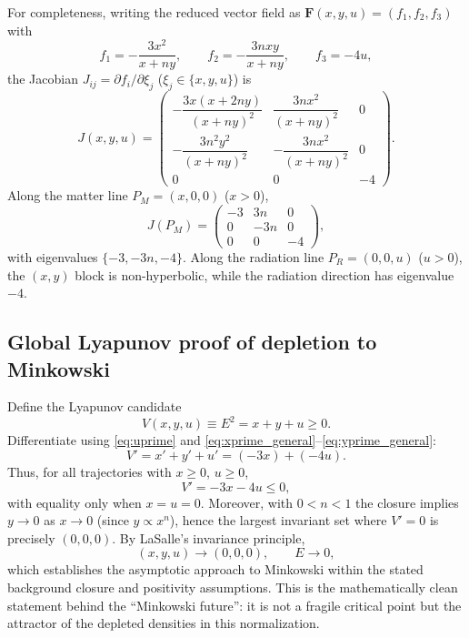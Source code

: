 \documentclass[pdflatex,sn-mathphys-num]{sn-jnl}%
\begin{document}
For completeness, writing the reduced vector field as
$\mathbf{F}(x,y,u)=(f_1,f_2,f_3)$ with
\begin{equation}
f_1=-\frac{3x^2}{x+ny},\qquad f_2=-\frac{3nxy}{x+ny},\qquad f_3=-4u,
\end{equation}
the Jacobian $J_{ij}=\partial f_i/\partial \xi_j$ ($\xi_j\in\{x,y,u\}$) is
\begin{equation}
J(x,y,u)=
\begin{pmatrix}
-\dfrac{3x(x+2ny)}{(x+ny)^2} & \dfrac{3n x^2}{(x+ny)^2} & 0 \\
-\dfrac{3n^2 y^2}{(x+ny)^2} & -\dfrac{3n x^2}{(x+ny)^2} & 0 \\
0 & 0 & -4
\end{pmatrix}.
\label{eq:jacobian}
\end{equation}
Along the matter line $P_M=(x,0,0)$ ($x>0$),
\begin{equation}
J(P_M)=
\begin{pmatrix}
-3 & 3n & 0\\
0 & -3n & 0\\
0 & 0 & -4
\end{pmatrix},
\end{equation}
with eigenvalues $\{-3,-3n,-4\}$. Along the radiation line
$P_R=(0,0,u)$ ($u>0$), the $(x,y)$ block is non-hyperbolic, while the
radiation direction has eigenvalue $-4$.

\subsection{Global Lyapunov proof of depletion to Minkowski}
\label{subsec:lyapunov}

Define the Lyapunov candidate
\begin{equation}
V(x,y,u) \equiv E^2 = x+y+u \ge 0.
\end{equation}
Differentiate using \eqref{eq:uprime} and \eqref{eq:xprime_general}--\eqref{eq:yprime_general}:
\begin{equation}
V' = x'+y'+u' = (-3x) + (-4u).
\label{eq:Vprime}
\end{equation}
Thus, for all trajectories with $x\ge 0$, $u\ge 0$,
\begin{equation}
V' = -3x - 4u \le 0,
\end{equation}
with equality only when $x=u=0$. Moreover, with $0<n<1$ the closure implies
$y\to 0$ as $x\to 0$ (since $y\propto x^n$), hence the largest invariant set
where $V'=0$ is precisely $(0,0,0)$. By LaSalle's invariance principle,
\begin{equation}
(x,y,u)\to (0,0,0),\qquad E\to 0,
\end{equation}
which establishes the asymptotic approach to Minkowski within the stated
background closure and positivity assumptions. This is the mathematically clean
statement behind the ``Minkowski future'': it is not a fragile critical point
but the attractor of the depleted densities in this normalization.
\end{document}
